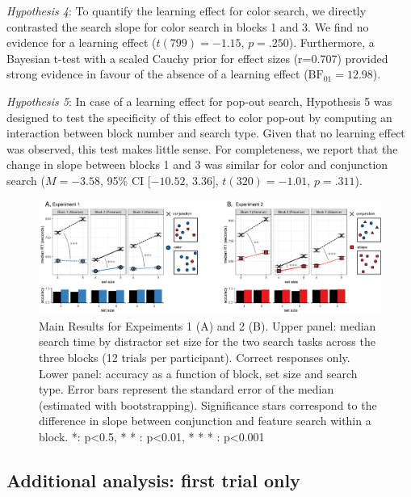 \documentclass[12pt,twoside]{reedthesis}
\begin{document}
\emph{Hypothesis 4}: To quantify the learning effect for color search, we directly contrasted the search slope for color search in blocks 1 and 3. We find no evidence for a learning effect (\(t(799) = -1.15\), \(p = .250\)). Furthermore, a Bayesian t-test with a scaled Cauchy prior for effect sizes (r=0.707) provided strong evidence in favour of the absence of a learning effect (\(\mathrm{BF}_{\textrm{01}} = 12.98\)).

\emph{Hypothesis 5}: In case of a learning effect for pop-out search, Hypothesis 5 was designed to test the specificity of this effect to color pop-out by computing an interaction between block number and search type. Given that no learning effect was observed, this test makes little sense. For completeness, we report that the change in slope between blocks 1 and 3 was similar for color and conjunction search (\(M = -3.58\), 95\% CI \([-10.52\), \(3.36]\), \(t(320) = -1.01\), \(p = .311\)).


\begin{figure}
\includegraphics[width=\textwidth]{figure/termination/Exps1_2} \caption[Search time and accuracy, Exp. 1 and 2]{Main Results for Expeiments 1 (A) and 2 (B). Upper panel: median search time by distractor set size for the two search tasks across the three blocks (12 trials per participant). Correct responses only. Lower panel: accuracy as a function of block, set size and search type. Error bars represent the standard error of the median (estimated with bootstrapping). Significance stars correspond to the difference in slope between conjunction and feature search within a block. *: p\textless0.5, * * : p\textless0.01, * * * : p\textless0.001}\label{fig:termination-resultsMain}
\end{figure}
\hypertarget{additional-analysis-first-trial-only}{%
\subsection{Additional analysis: first trial only}\label{additional-analysis-first-trial-only}}
\end{document}

